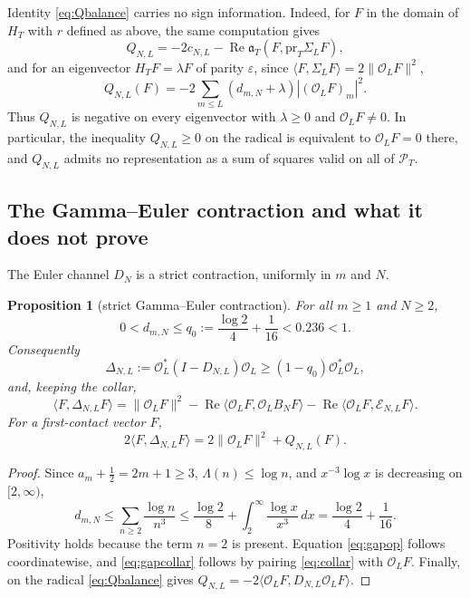 \documentclass[11pt]{amsart}
\newtheorem{proposition}[theorem]{Proposition}
\theoremstyle{definition}
\theoremstyle{remark}
\newcommand{\Rel}{\operatorname{Re}}
\newcommand{\PT}{\mathcal P_T}
\begin{document}
Identity \eqref{eq:Qbalance} carries no sign information. Indeed, for $F$ in the domain of $H_T$
with $r$ defined as above, the same computation gives
\begin{equation}\label{eq:Qrecombine}
 Q_{N,L}=-2c_{N,L}-\Rel\mathfrak a_T(F,\mathrm{pr}_T\Sigma_LF),
\end{equation}
and for an eigenvector $H_TF=\lambda F$ of parity $\varepsilon$, since
$\langle F,\Sigma_LF\rangle=2\|\mathcal O_LF\|^2$,
\begin{equation}\label{eq:Qspectral}
 Q_{N,L}(F)=-2\sum_{m\le L}(d_{m,N}+\lambda)|(\mathcal O_LF)_m|^2.
\end{equation}
Thus $Q_{N,L}$ is negative on every eigenvector with $\lambda\ge0$ and $\mathcal O_LF\ne0$. In particular, the
inequality $Q_{N,L}\ge0$ on the radical is equivalent to $\mathcal O_LF=0$ there, and $Q_{N,L}$ admits no
representation as a sum of squares valid on all of $\PT$.

\subsection{The Gamma--Euler contraction and what it does not prove}

The Euler channel $D_N$ is a strict contraction, uniformly in $m$ and $N$.

\begin{proposition}[strict Gamma--Euler contraction]\label{prop:GEgap}
For all $m\ge1$ and $N\ge2$,
\[
 0<d_{m,N}\le q_0:=\frac{\log2}{4}+\frac1{16}<0.236<1.
\]
Consequently
\begin{equation}\label{eq:gapop}
 \Delta_{N,L}:=\mathcal O_L^*(I-D_{N,L})\mathcal O_L
 \ge(1-q_0)\mathcal O_L^*\mathcal O_L,
\end{equation}
and, keeping the collar,
\begin{equation}\label{eq:gapcollar}
 \langle F,\Delta_{N,L}F\rangle
 =\|\mathcal O_LF\|^2-\Rel\langle \mathcal O_LF,\mathcal O_LB_NF\rangle
  -\Rel\langle \mathcal O_LF,\mathcal E_{N,L}F\rangle.
\end{equation}
For a first-contact vector $F$,
\begin{equation}\label{eq:gapQ}
 2\langle F,\Delta_{N,L}F\rangle=2\|\mathcal O_LF\|^2+Q_{N,L}(F).
\end{equation}
\end{proposition}
\begin{proof}
Since $a_m+\frac12=2m+1\ge3$, $\Lambda(n)\le\log n$, and $x^{-3}\log x$ is decreasing on $[2,\infty)$,
\[
 d_{m,N}\le\sum_{n\ge2}\frac{\log n}{n^3}
 \le\frac{\log2}{8}+\int_2^\infty\frac{\log x}{x^3}\,dx
 =\frac{\log2}{4}+\frac1{16}.
\]
Positivity holds because the term $n=2$ is present. Equation \eqref{eq:gapop} follows coordinatewise,
and \eqref{eq:gapcollar} follows by pairing \eqref{eq:collar} with $\mathcal O_LF$. Finally, on the radical
\eqref{eq:Qbalance} gives $Q_{N,L}=-2\langle \mathcal O_LF,D_{N,L}\mathcal O_LF\rangle$.
\end{proof}
\end{document}
